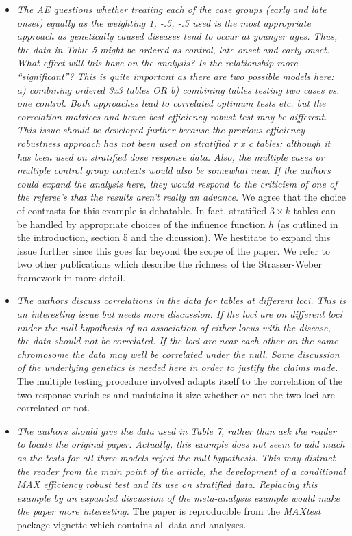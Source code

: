 \documentclass{article}
\begin{document}
\begin{itemize}
\item
\textit{The AE questions whether treating each of the case groups (early and late onset)
equally as the weighting 1, -.5, -.5 used is the most appropriate approach as genetically
caused diseases tend to occur at younger ages. Thus, the data in Table 5 might be ordered
as control, late onset and early onset. What effect will this have on the analysis? Is the
relationship more “significant”? This is quite important as there are two possible models
here: a) combining ordered 3x3 tables OR b) combining tables testing two cases vs. one
control. Both approaches lead to correlated optimum tests etc. but the correlation matrices
and hence best efficiency robust test may be different. This issue should be developed
further because the previous efficiency robustness approach has not been used on
stratified r x c tables; although it has been used on stratified dose response data. Also, the
multiple cases or multiple control group contexts would also be somewhat new. If the
authors could expand the analysis here, they would respond to the criticism of one of the
referee’s that the results aren’t really an advance.}
We agree that the choice of contrasts for this example is debatable.
In fact, stratified $3 \times k$ tables can be handled by appropriate
choices of the influence function $h$ (as outlined in the introduction,
section 5 and the dicussion). We hestitate to expand this issue further
since this goes far beyond the scope of the paper. We refer to two
other publications which describe the richness of the Strasser-Weber
framework in more detail.

\item
\textit{
The authors discuss correlations in the data for tables at different loci. This is an
interesting issue but needs more discussion. If the loci are on different loci under the null
hypothesis of no association of either locus with the disease, the data should not be
correlated. If the loci are near each other on the same chromosome the data may well be
correlated under the null. Some discussion of the underlying genetics is needed here in
order to justify the claims made.}
The multiple testing procedure involved adapts itself to the correlation
of the two response variables and maintains it size whether or not the
two loci are correlated or not.

\item
\textit{
The authors should give the data used in Table 7, rather than ask the reader to locate
the original paper. Actually, this example does not seem to add much as the tests for all
three models reject the null hypothesis. This may distract the reader from the main point
of the article, the development of a conditional MAX efficiency robust test and its use on
stratified data. Replacing this example by an expanded discussion of the meta-analysis
example would make the paper more interesting.}
The paper is reproducible from the \textit{MAXtest} package vignette which
contains all data and analyses.


\end{itemize}
\end{document}
